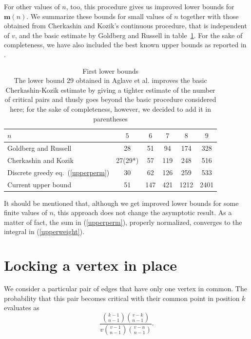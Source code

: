 \documentclass[a4paper,12pt]{article}
\begin{document}
For other values of $n$, too, this procedure
gives us improved lower
bounds for $\mathbf m(n)$. We summarize these bounds for small values of $n$
 together with those
obtained from Cherkashin and Kozik's \cite{cherk} continuous procedure,
that is independent of $v$, and the basic estimate by
Goldberg and Russell \cite{gold}
in table~\ref{table1}. For the sake of completeness, we have also included
the best known upper bounds as reported in \cite{shanni}.

\begin{table}[ht]
\begin{center}
\begin{tabular}{|l|c|c|c|c|c|}
\hline
$n$ & $5$ & $6$ & $7$ & $8$ & $9$ \\\hline
Goldberg and Russell \cite{gold} & 28 & 51 & 94 & 174 & 328 \\\hline
Cherkashin and Kozik \cite{cherk} & 27(29*) & 57 & 119 & 248 & 516\\\hline
Discrete greedy eq.\ (\ref{upperperm}) & 30 & 62 & 126 & 259 & 533\\\hline
Current upper bound \cite{shanni} & 51 & 147 & 421 & 1212 & 2401\\\hline
\end{tabular}
\caption{First lower bounds\\{\small *The lower bound 29 obtained in Aglave et 
al.\cite{shanni} improves the basic Cherkashin-Kozik estimate by giving a 
tighter estimate of the number of critical pairs and thusly goes beyond the 
basic procedure considered here; for the sake of completeness, however, we 
decided to add it in parentheses}}
\label{table1}
\end{center}
\end{table}

It should be mentioned that, although we get improved lower bounds for some
finite values of $n$, this approach
does not change the asymptotic result. As a matter 
of fact, the sum in (\ref{upperperm}), properly normalized, converges to the
integral in (\ref{upperweight}).

\section{Locking a vertex in place}
We consider a particular pair of edges that have only one vertex in common.
The probability that this pair becomes critical with their common point
in position $k$ evaluates as
\[\frac{\genfrac(){0pt}1{k-1}{n-1}\genfrac(){0pt}1{v-k}{n-1}}
{v\genfrac(){0pt}1{v-1}{n-1}\genfrac(){0pt}1{v-n}{n-1}}.\]
\end{document}
